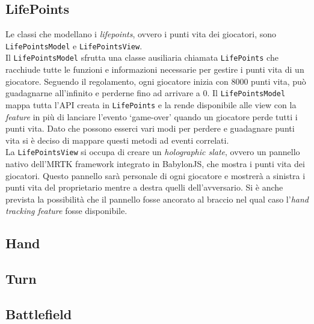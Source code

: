 \subsection{LifePoints}\label{subsec:lifepoints}
Le classi che modellano i \textit{lifepoints}, ovvero i punti vita dei giocatori, sono \texttt{LifePointsModel} e \texttt{LifePointsView}.\\
Il \texttt{LifePointsModel} sfrutta una classe ausiliaria chiamata \texttt{LifePoints} che racchiude tutte le funzioni e informazioni necessarie per gestire i punti vita di un giocatore.
Seguendo il regolamento, ogni giocatore inizia con 8000 punti vita, può guadagnarne all'infinito e perderne fino ad arrivare a 0. Il \texttt{LifePointsModel} mappa tutta l'API creata
in \texttt{LifePoints} e la rende disponibile alle view con la \textit{feature} in più di lanciare l'evento `game-over' quando un giocatore perde tutti i punti vita. Dato che possono
esserci vari modi per perdere e guadagnare punti vita si è deciso di mappare questi metodi ad eventi correlati.\\
La \texttt{LifePointsView} si occupa di creare un \textit{holographic slate}, ovvero un pannello nativo dell'MRTK framework integrato in BabylonJS, che mostra i punti vita dei giocatori.
Questo pannello sarà personale di ogni giocatore e mostrerà a sinistra i punti vita del proprietario mentre a destra quelli dell'avversario. Si è anche prevista la possibilità che il
pannello fosse ancorato al braccio nel qual caso l'\textit{hand tracking feature} fosse disponibile.\\

\subsection{Hand}\label{subsec:hand}
\subsection{Turn}\label{subsec:turn}
\subsection{Battlefield}\label{subsec:battlefield}

